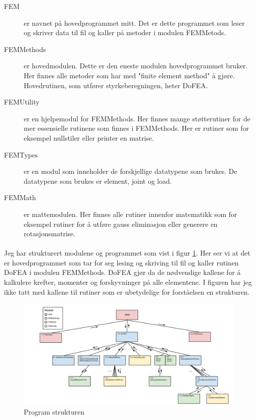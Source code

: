 \documentclass[10pt,a4paper, norsk]{article}
\begin{document}
\begin{description}
\item[FEM] er navnet på hovedprogrammet mitt. Det er dette programmet som leser og skriver data til fil og kaller på metoder i modulen FEMMetods.
\item[FEMMethods] er hovedmodulen. Dette er den eneste modulen hovedprogrammet bruker. Her finnes alle metoder som har med "finite element method" å gjøre. Hovedrutinen, som utfører styrkeberegningen, heter DoFEA.
\item[FEMUtility] er en hjelpemodul for FEMMethods. Her finnes mange støtterutiner for de mer essensielle rutinene som finnes i FEMMethods. Her er rutiner som for eksempel nullstiler eller printer en matrise.
\item[FEMTypes] er en modul som inneholder de forskjellige datatypene som brukes. De datatypene som brukes er element, joint og load.
\item[FEMMath] er mattemodulen. Her finnes alle rutiner innenfor matematikk som for eksempel rutiner for å utføre gauss eliminasjon eller generere en rotasjonsmatrise.
\end{description}

\paragraph*{}
Jeg har strukturert modulene og programmet som vist i figur \ref{fig:struktur}. Her ser vi at det er hovedprogrammet som tar for seg lesing og skriving til fil og kaller rutinen DoFEA i modulen FEMMethods. DoFEA gjør da de nødvendige kallene for å kalkulere krefter, momenter og forskyvninger på alle elementene. I figuren har jeg ikke tatt med kallene til rutiner som er ubetydelige for forståelsen en strukturen.

\begin{figure}[h]
\centering
\includegraphics[scale=0.31]{FEMAStructure.png} 
\caption{Program strukturen}
\label{fig:struktur}
\end{figure}
\end{document}

